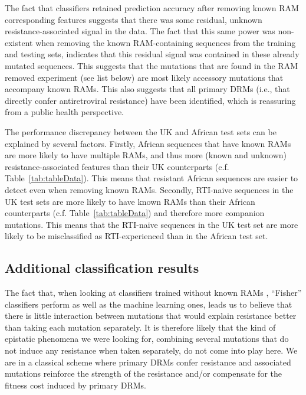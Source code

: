 \documentclass[
  11pt,
  twoside,
  BCOR=10mm,
  listof=totoc]{scrbook}
\begin{document}
The fact that classifiers retained prediction accuracy after removing
known RAM corresponding features suggests that there was some residual,
unknown resistance-associated signal in the data. The fact that this
same power was non-existent when removing the known RAM-containing
sequences from the training and testing sets, indicates that this
residual signal was contained in these already mutated sequences. This
suggests that the mutations that are found in the RAM removed experiment
(see list below) are most likely accessory mutations that accompany
known RAMs. This also suggests that all primary DRMs (i.e., that
directly confer antiretroviral resistance) have been identified, which
is reassuring from a public health perspective.

The performance discrepancy between the UK and African test sets can be
explained by several factors. Firstly, African sequences that have known
RAMs are more likely to have multiple RAMs, and thus more (known and
unknown) resistance-associated features than their UK counterparts (c.f.
Table~\ref{tab:tableData}). This
means that resistant African sequences are easier to detect even when
removing known RAMs. Secondly, RTI-naive sequences in the UK test sets
are more likely to have known RAMs than their African counterparts (c.f.
Table~\ref{tab:tableData}) and
therefore more companion mutations. This means that the RTI-naive
sequences in the UK test set are more likely to be misclassified as
RTI-experienced than in the African test set.

\hypertarget{additional-classification-results}{%
\subsection{Additional classification results}\label{additional-classification-results}}

The fact that, when looking at classifiers trained without known RAMs ,
``Fisher'' classifiers perform as well as the machine learning ones, leads
us to believe that there is little interaction between mutations that
would explain resistance better than taking each mutation separately. It
is therefore likely that the kind of epistatic phenomena we were looking
for, combining several mutations that do not induce any resistance when
taken separately, do not come into play here. We are in a classical
scheme where primary DRMs confer resistance and associated mutations
reinforce the strength of the resistance and/or compensate for the
fitness cost induced by primary DRMs.
\end{document}
